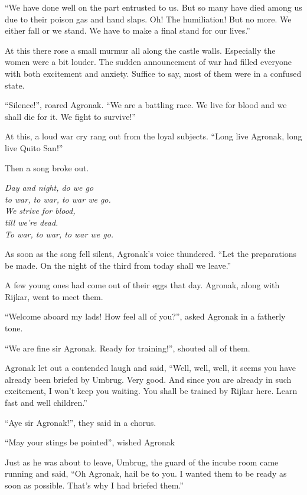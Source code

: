 \documentclass[twoside,11pt]{article}
\begin{document}
``We have done well on the part entrusted to us. But so many have died among us due to their poison gas and hand slaps. Oh! The humiliation! But no more. We either fall or we stand. We have to make a final stand for our lives.''

At this there rose a small murmur all along the castle walls. Especially the women were a bit louder. The sudden announcement of war had filled everyone with both excitement and anxiety. Suffice to say, most of them were in a confused state.

``Silence!'', roared Agronak. ``We are a battling race. We live for blood and we shall die for it. We fight to survive!''

At this, a loud war cry rang out from the loyal subjects. ``Long live Agronak, long live Quito San!''

Then a song broke out.\\
\medskip
\begin{center}
\emph{Day and night, do we go \\ to war, to war, to war we go. \\We strive for blood, \\till we're dead. \\To war, to war, to war we go.}
\end{center}

As soon as the song fell silent, Agronak's voice thundered. ``Let the preparations be made. On the night of the third from today shall we leave.''

A few young ones had come out of their eggs that day. Agronak, along with Rijkar, went to meet them.

``Welcome aboard my lads! How feel all of you?'', asked Agronak in a fatherly tone.

``We are fine sir Agronak. Ready for training!'', shouted all of them.

Agronak let out a contended laugh and said, ``Well, well, well, it seems you have already been briefed by Umbrug. Very good. And since you are already in such excitement, I won’t keep you waiting. You shall be trained by Rijkar here. Learn fast and well children.''

``Aye sir Agronak!'', they said in a chorus.

``May your stings be pointed'', wished Agronak

Just as he was about to leave, Umbrug, the guard of the incube room came running and said, ``Oh Agronak, hail be to you. I wanted them to be ready as soon as possible. That's why I had briefed them.''
\end{document}
